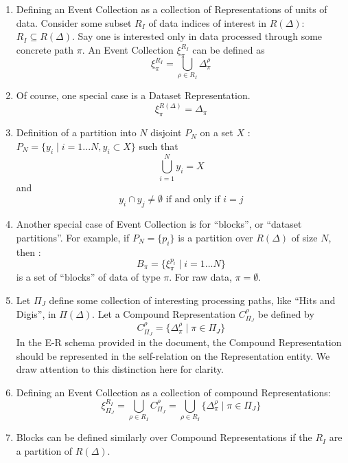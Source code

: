 \documentclass{cmspaper}
\begin{document}
\begin{enumerate}

\item Defining an Event Collection as a collection of Representations of units of data.  
Consider some
subset $R_I$ of data indices of interest in $R(\Delta)$:  $R_I \subseteq R(\Delta)$.
Say one is interested only in 
data processed through some concrete path $\pi$.  An Event Collection $\xi_{\pi}^{R_I}$
can be defined as 
\begin{equation}
\xi_{\pi}^{R_I} = \bigcup_{\rho \in R_I} \Delta_{\pi}^{\rho}
\end{equation}

\item Of course, one special case is a Dataset Representation. 
\begin{equation} 
\xi_{\pi}^{R(\Delta)} = \Delta_{\pi}
\end{equation}


\item Definition of a partition into $N$ disjoint $P_N$ on a set $X$ : 
$ P_N = \{ y_i \mid i = 1...N, y_i \subset X \} $ such that 
\begin{equation}
\bigcup_{i=1}^N y_i = X
\end{equation} 
and 
\begin{equation} 
y_i \cap y_j \neq \emptyset \mbox{ if and only if } i = j
\end{equation}
 
\item  Another special case of Event Collection 
is for ``blocks'', or ``dataset partitions''.  For example, if
$P_N = \{ p_i \}$ is a partition over $R(\Delta)$ of size $N$, then : 
\begin{equation}
B_{\pi} = \{ \xi_{\pi}^{p_i} \mid i = 1...N\}
\end{equation}
is a set of ``blocks'' of data of type $\pi$.  For raw data, $\pi = \emptyset$.


\item Let $\Pi_J$ define some collection of interesting processing paths, like ``Hits and Digis'', 
in $\Pi(\Delta)$.  Let a Compound Representation $C_{\Pi_J}^{\rho}$ be defined by
\begin{equation}
C_{\Pi_J}^{\rho} = \{ \Delta_{\pi}^{\rho} \mid \pi \in \Pi_J \}
\end{equation}
In the E-R schema provided in the document, the Compound Representation should be 
represented in the self-relation on the Representation entity.  We draw attention to 
this distinction here for clarity.

\item Defining an Event Collection as a collection of compound Representations: 
\begin{equation}
\xi_{\Pi_J}^{R_I} = \bigcup_{\rho \in R_I} C_{\Pi_J}^{\rho} = \bigcup_{\rho \in R_I} \{ \Delta_{\pi}^{\rho} \mid \pi \in \Pi_J \}
\end{equation}

\item Blocks can be defined similarly over Compound Representations if the $R_I$ are a partition 
of $R(\Delta)$.

\end{enumerate}
\end{document}
